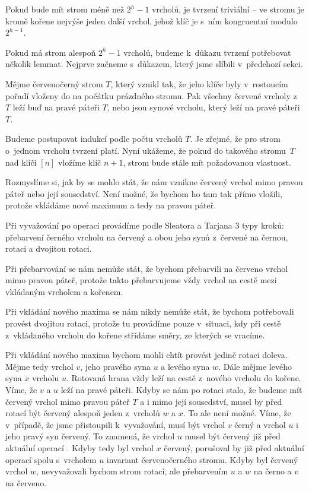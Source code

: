 \begin{dukaz}
Pokud bude mít strom méně než $2^h-1$ vrcholů, je tvrzení triviální -- ve stromu je kromě kořene nejvýše jeden další vrchol, jehož klíč je s~ním kongruentní modulo $2^{h-1}$.

Pokud má strom alespoň $2^h-1$ vrcholů, budeme k~důkazu tvrzení potřebovat několik lemmat.
Nejprve začneme s~důkazem, který jsme slíbili v~předchozí sekci.

\begin{lemma}
Mějme červenočerný strom $T$, který vznikl tak, že jeho klíče byly v~rostoucím pořadí vloženy do na počátku prázdného stromu. Pak všechny červené vrcholy z~$T$ leží buď na pravé páteři $T$, nebo jsou synové vrcholu, který leží na pravé páteři $T$.
\end{lemma}
\begin{dukaz}
Budeme postupovat indukcí podle počtu vrcholů $T$. Je zřejmé, že pro strom o~jednom vrcholu tvrzení platí. Nyní ukážeme, že pokud do takového stromu~$T$ nad klíči $[n]$ vložíme klíč $n+1$, strom bude stále mít požadovanou vlastnost.

Rozmyslíme si, jak by se mohlo stát, že nám vznikne červený vrchol mimo pravou
páteř nebo její sousedství. Není možné, že bychom ho tam tak přímo vložili,
protože vkládáme nové maximum a tedy na pravou páteř.

Při vyvažování po operaci
 provádíme podle Sleatora a Tarjana \citeyearpar{splay} 3 typy kroků: přebarvení černého vrcholu na červený a obou
jeho synů z~červené na černou, rotaci a dvojitou rotaci.

Při přebarvování se nám nemůže stát, že bychom přebarvili na červeno vrchol mimo pravou páteř, protože takto přebarvujeme vždy vrchol na cestě mezi vkládaným vrcholem a kořenem.

Při vkládání nového maxima se nám nikdy nemůže stát, že bychom potřebovali provést dvojitou rotaci, protože tu provádíme pouze v~situaci, kdy při cestě z~vkládaného vrcholu do kořene střídáme směry, ze kterých se vracíme.

Při vkládání nového maxima bychom mohli chtít provést jedině rotaci doleva.
Mějme tedy vrchol $v$, jeho pravého syna $u$ a levého syna $w$. Dále mějme levého syna $x$ vrcholu $u$.
Rotovaná hrana vždy leží na cestě z~nového vrcholu do kořene. Víme, že $v$ a
$u$ leží na pravé páteři. Kdyby se nám po rotaci stalo, že budeme mít červený vrchol mimo pravou páteř $T$ a i mimo její sousedství, musel by před rotací být červený alespoň jeden z~vrcholů $w$ a $x$. To ale není možné. Víme, že v~případě, že jsme přistoupili k~vyvažování, musí být vrchol $v$ černý a vrchol $u$ i jeho pravý syn červený. To znamená, že vrchol $u$ musel být červený již před aktuální operací . Kdyby tedy byl vrchol $x$ červený, porušoval by již před aktuální operací  spolu s~vrcholem $u$ invariant červenočerného stromu. Kdyby byl červený vrchol $w$, nevyvažovali bychom strom rotací, ale přebarvením $u$ a $w$ na černo a $v$ na červeno. 
\end{dukaz}


\end{dukaz}
